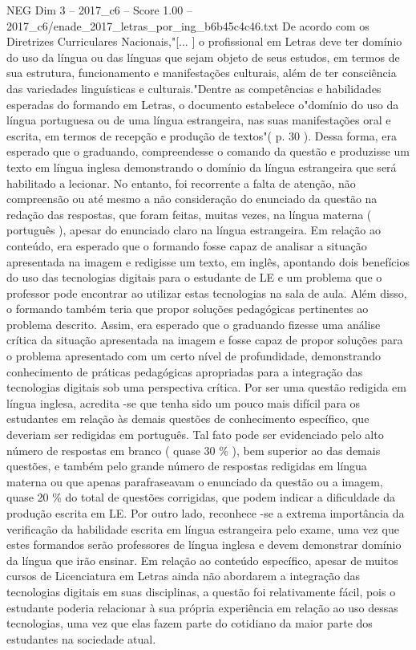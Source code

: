 \begin{textsample}{NEG Dim 3 – 2017\_c6 – Score 1.00 – 2017\_c6/enade\_2017\_letras\_por\_ing\_b6b45c4c46.txt}
De acordo com os Diretrizes Curriculares Nacionais,"[... ] o profissional em Letras deve ter domínio do uso da língua ou das línguas que sejam objeto de seus estudos, em termos de sua estrutura, funcionamento e manifestações culturais, além de ter consciência das variedades linguísticas e culturais."Dentre as competências e habilidades esperadas do formando em Letras, o documento estabelece o"domínio do uso da língua portuguesa ou de uma língua estrangeira, nas suas manifestações oral e escrita, em termos de recepção e produção de textos"( p. 30 ).
Dessa forma, era esperado que o graduando, compreendesse o comando da questão e produzisse um texto em língua inglesa demonstrando o domínio da língua estrangeira que será habilitado a lecionar.
No entanto, foi recorrente a falta de atenção, não compreensão ou até mesmo a não consideração do enunciado da questão na redação das respostas, que foram feitas, muitas vezes, na língua materna ( português ), apesar do enunciado claro na língua estrangeira.
Em relação ao conteúdo, era esperado que o formando fosse capaz de analisar a situação apresentada na imagem e redigisse um texto, em inglês, apontando dois benefícios do uso das tecnologias digitais para o estudante de LE e um problema que o professor pode encontrar ao utilizar estas tecnologias na sala de aula.
Além disso, o formando também teria que propor soluções pedagógicas pertinentes ao problema descrito.
Assim, era esperado que o graduando fizesse uma análise crítica da situação apresentada na imagem e fosse capaz de propor soluções para o problema apresentado com um certo nível de profundidade, demonstrando conhecimento de práticas pedagógicas apropriadas para a integração das tecnologias digitais sob uma perspectiva crítica.
Por ser uma questão redigida em língua inglesa, acredita -se que tenha sido um pouco mais difícil para os estudantes em relação às demais questões de conhecimento específico, que deveriam ser redigidas em português.
Tal fato pode ser evidenciado pelo alto número de respostas em branco ( quase 30 \% ), bem superior ao das demais questões, e também pelo grande número de respostas redigidas em língua materna ou que apenas parafraseavam o enunciado da questão ou a imagem, quase 20 \% do total de questões corrigidas, que podem indicar a dificuldade da produção escrita em LE.
Por outro lado, reconhece -se a extrema importância da verificação da habilidade escrita em língua estrangeira pelo exame, uma vez que estes formandos serão professores de língua inglesa e devem demonstrar domínio da língua que irão ensinar.
Em relação ao conteúdo específico, apesar de muitos cursos de Licenciatura em Letras ainda não abordarem a integração das tecnologias digitais em suas disciplinas, a questão foi relativamente fácil, pois o estudante poderia relacionar à sua própria experiência em relação ao uso dessas tecnologias, uma vez que elas fazem parte do cotidiano da maior parte dos estudantes na sociedade atual.

\end{textsample}
